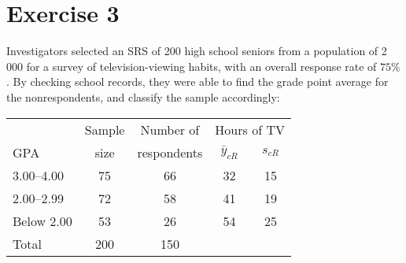 \documentclass[12pt]{article}
\begin{document}
\section*{Exercise 3}
Investigators selected an SRS of 200 high school seniors from a population of 2 000
for a survey of television-viewing habits, with an overall response rate of $75\%$. By
checking school records, they were able to find the grade point average for the nonrespondents,
and classify the sample accordingly: 
\begin{center}
\begin{tabular}{lcccc}
& Sample & Number of & \multicolumn{2}{c}{Hours of TV}\\
GPA& size & respondents & $\bar{y}_{cR}$ & $s_{cR}$ \\
\hline
3.00–4.00 & 75& 66& 32& 15\\
2.00–2.99& 72& 58& 41& 19\\
Below 2.00& 53& 26& 54& 25\\
\hline
Total & 200 & 150 && \\
\end{tabular}
\end{center}
\end{document}
